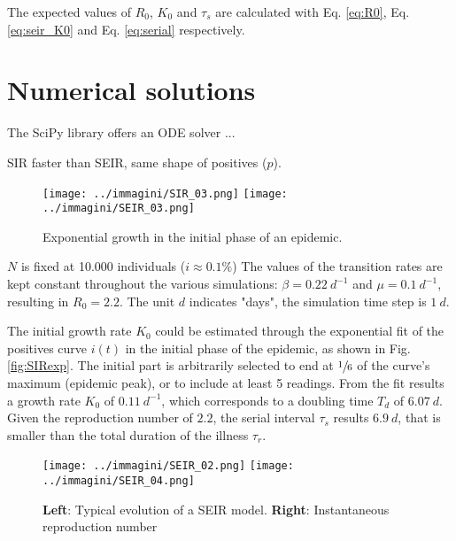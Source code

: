 \documentclass[DIV=12, BCOR=0pt]{scrartcl}  %
\begin{document}
  The expected values of $R_0$, $K_0$ and $\tau_s$ are calculated with Eq. \ref{eq:R0}, Eq. \ref{eq:seir_K0} and Eq. \ref{eq:serial} respectively.
  

  
  
  \section{Numerical solutions}
	The SciPy library offers an ODE solver ...
	

	SIR faster than SEIR, same shape of positives ($p$).
	
		 \begin{figure}[h!]
		\centering
		\texttt{[image: ../immagini/SIR\_03.png]}
		\texttt{[image: ../immagini/SEIR\_03.png]}
		\caption{Exponential growth in the initial phase of an epidemic. }
		\label{fig:BothExp}
	\end{figure}

	$N$ is fixed at 10.000 individuals
	($i \approx 0.1 \%$)
	The values of the transition rates are kept constant throughout the various simulations: $\beta = 0.22 \ d^{-1}$ and $\mu = 0.1 \ d^{-1}$, resulting in $R_0 = 2.2$. The unit $d$ indicates "days", the simulation time step is $1 \ d$.



	The initial growth rate $K_0$ could be estimated through the exponential fit of the positives curve $i(t)$ in the initial phase of the epidemic, as shown in Fig. \ref{fig:SIRexp}. The initial part is arbitrarily selected to end at $\sfrac{1}{6}$ of the curve's maximum (epidemic peak), or to include at least 5 readings. From the fit results a growth rate $K_0$ of $0.11 \ d^{-1}$, which corresponds to a doubling time $T_{d}$ of $6.07 \ d$. Given the reproduction number of $2.2$, the serial interval $\tau_s$ results $6.9 \ d$, that is smaller than the total duration of the illness $\tau_{r}$.

	\begin{figure}[h!]
		\centering
		\texttt{[image: ../immagini/SEIR\_02.png]}
		\texttt{[image: ../immagini/SEIR\_04.png]}
		\caption{\textbf{Left}: Typical evolution of a SEIR model. \textbf{Right}: Instantaneous reproduction number }
		\label{fig:SIRtot}
	\end{figure}
	 
\end{document}
